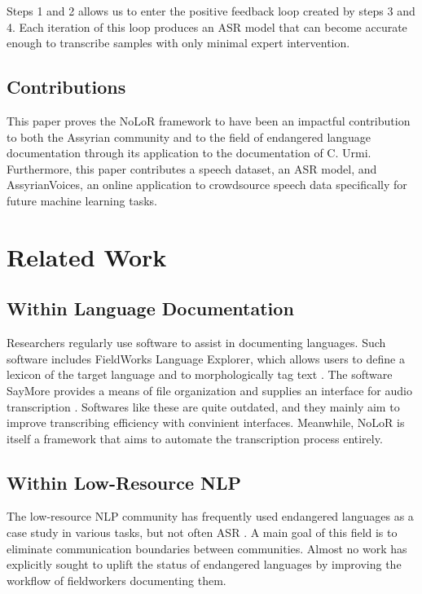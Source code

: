 \documentclass[letterpaper]{article} %
\begin{document}
Steps 1 and 2 allows us to enter the positive feedback loop created by steps 3 and 4. Each iteration of this loop produces an ASR model that can become accurate enough to transcribe samples with only minimal expert intervention.

\subsection{Contributions}

This paper proves the NoLoR framework to have been an impactful contribution to both the Assyrian community and to the field of endangered language documentation through its application to the documentation of C. Urmi. Furthermore, this paper contributes a speech dataset, an ASR model, and AssyrianVoices, an online application to crowdsource speech data specifically for future machine learning tasks.

\section{Related Work}

\subsection{Within Language Documentation}
Researchers regularly use software to assist in documenting languages. Such software includes FieldWorks Language Explorer, which allows users to define a lexicon of the target language and to morphologically tag text \cite{flex}. The software SayMore provides a means of file organization and supplies an interface for audio transcription \cite{saymore}. Softwares like these are quite outdated, and they mainly aim to improve transcribing efficiency with convinient interfaces. Meanwhile, NoLoR is itself a framework that aims to automate the transcription process entirely.

\subsection{Within Low-Resource NLP}

The low-resource NLP community has frequently used endangered languages as a case study in various tasks, but not often ASR \cite{hedderich,ranathunga,adams-etal-2017-cross}. A main goal of this field is to eliminate communication boundaries between communities. Almost no work has explicitly sought to uplift the status of endangered languages by improving the workflow of fieldworkers documenting them.
\end{document}
